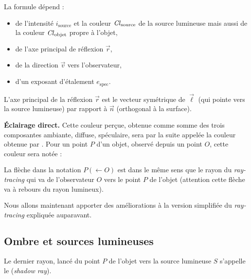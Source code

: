 \documentclass[11pt,class=report,crop=false]{standalone}
\begin{document}

La formule dépend :
\begin{itemize}
	\item de l'intensité $i_{\text{source}}$ et la couleur $\operatorname{\it Cl}_{\text{source}}$ de la source lumineuse mais aussi de la couleur $\operatorname{\it Cl}_{\text{objet}}$ propre à l'objet, 
	\item de l'axe principal de réflexion $\vec r$,
	\item de la direction $\vec v$ vers l'observateur,
	\item d'un exposant d'étalement $e_{\text{spec}}$.
\end{itemize}

L'axe principal de la réflexion $\vec r$ est le vecteur symétrique de $\vec\ell$ (qui pointe vers la source lumineuse) par rapport à $\vec n$ (orthogonal à la surface).



\medskip

\textbf{Éclairage direct.}
Cette couleur perçue, obtenue comme somme des trois composantes ambiante, diffuse, spéculaire, sera par la suite appelée la couleur obtenue par .
Pour un point $P$ d'un objet, observé depuis un point $O$, cette couleur sera notée :

La flèche dans la notation \og{}$P (\leftarrow O)$\fg{} est dans le même sens que le rayon du \emph{ray-tracing} qui va de l'observateur $O$ vers le point $P$ de l'objet (attention cette flèche va à rebours du rayon lumineux).


\medskip

Nous allons maintenant apporter des améliorations à la version simplifiée du \emph{ray-tracing} expliquée auparavant.



\subsection{Ombre et sources lumineuses}

Le dernier rayon, lancé du point $P$ de l'objet vers la source lumineuse $S$ s'appelle le  (\emph{shadow ray}).
\end{document}
